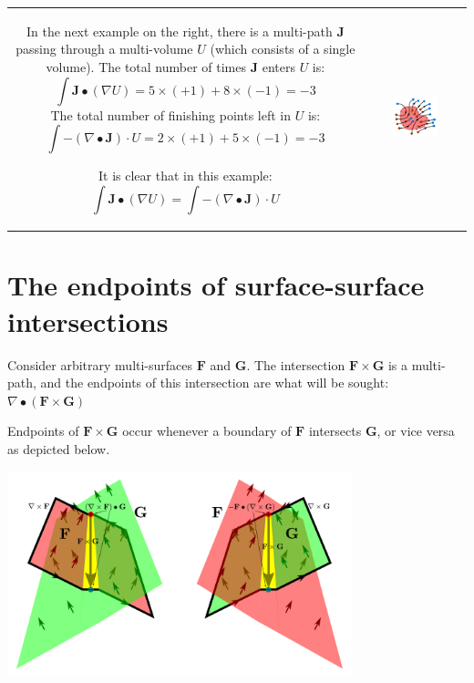 \begin{tabular}{cc}
\parbox{0.5\textwidth}{
In the next example on the right, there is a multi-path \(\mathbf{J}\) passing through a multi-volume \(U\) (which consists of a single volume). The total number of times \(\mathbf{J}\) enters \(U\) is: 
\[\int \mathbf{J} \bullet (\nabla U) = 5 \times (+1) + 8 \times (-1) = -3\] 
The total number of finishing points left in \(U\) is:
\[\int -(\nabla \bullet \mathbf{J}) \cdot U = 2 \times (+1) + 5 \times (-1) = -3\]

It is clear that in this example:
 \[\int \mathbf{J} \bullet (\nabla U) = \int -(\nabla \bullet \mathbf{J}) \cdot U\]

} & \parbox{0.5\textwidth}{
\includegraphics[width = 0.5\textwidth]{Boundaries/Path_endpoints/Divergence_theorem}
}
\end{tabular}




\section{The endpoints of surface-surface intersections}

Consider arbitrary multi-surfaces \(\mathbf{F}\) and \(\mathbf{G}\). The intersection \(\mathbf{F} \times \mathbf{G}\) is a multi-path, and the endpoints of this intersection are what will be sought: \(\nabla \bullet (\mathbf{F} \times \mathbf{G})\)

Endpoints of \(\mathbf{F} \times \mathbf{G}\) occur whenever a boundary of \(\mathbf{F}\) intersects \(\mathbf{G}\), or vice versa as depicted below. 

\begin{center}
\includegraphics[width = 0.75\textwidth]{Boundaries/Path_endpoints/surface_surface_intersection_endpoints_2}
\end{center}

